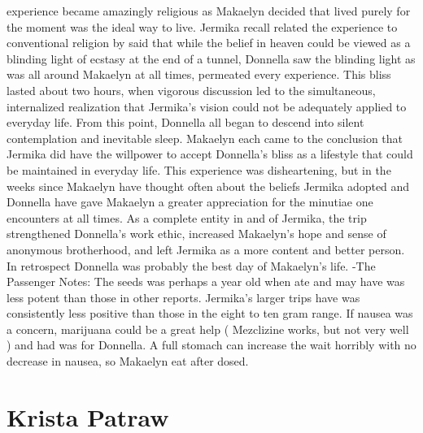 \documentclass[12pt]{book}
\begin{document}
experience became amazingly religious as Makaelyn decided that lived purely for the moment was the ideal way to live. Jermika recall related the experience to conventional religion by said that while the belief in heaven could be viewed as a blinding light of ecstasy at the end of a tunnel, Donnella saw the blinding light as was all around Makaelyn at all times, permeated every experience. This bliss lasted about two hours, when vigorous discussion led to the simultaneous, internalized realization that Jermika's vision could not be adequately applied to everyday life. From this point, Donnella all began to descend into silent contemplation and inevitable sleep. Makaelyn each came to the conclusion that Jermika did have the willpower to accept Donnella's bliss as a lifestyle that could be maintained in everyday life. This experience was disheartening, but in the weeks since Makaelyn have thought often about the beliefs Jermika adopted and Donnella have gave Makaelyn a greater appreciation for the minutiae one encounters at all times. As a complete entity in and of Jermika, the trip strengthened Donnella's work ethic, increased Makaelyn's hope and sense of anonymous brotherhood, and left Jermika as a more content and better person. In retrospect Donnella was probably the best day of Makaelyn's life. -The Passenger Notes: The seeds was perhaps a year old when ate and may have was less potent than those in other reports. Jermika's larger trips have was consistently less positive than those in the eight to ten gram range. If nausea was a concern, marijuana could be a great help ( Mezclizine works, but not very well ) and had was for Donnella. A full stomach can increase the wait horribly with no decrease in nausea, so Makaelyn eat after dosed.



\chapter{Krista Patraw}
\end{document}
